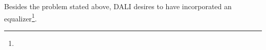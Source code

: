 Besides the problem stated above, DALI desires to have incorporated an equalizer\footnote{ }. %




